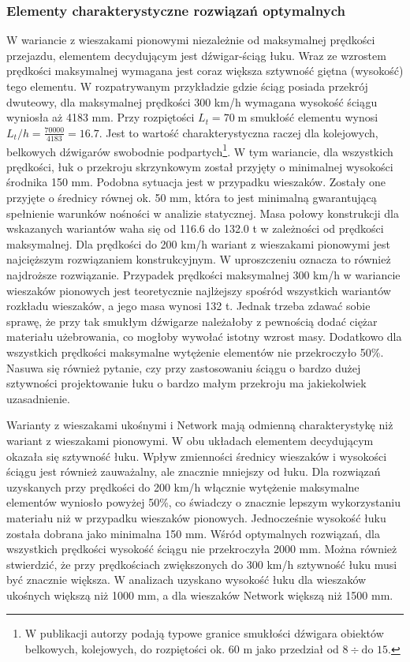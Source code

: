 \subsubsection{Elementy charakterystyczne rozwiązań optymalnych}
W wariancie z wieszakami pionowymi niezależnie od maksymalnej prędkości przejazdu, elementem decydującym jest dźwigar-ściąg łuku. Wraz ze wzrostem prędkości maksymalnej wymagana jest coraz większa sztywność giętna (wysokość) tego elementu. W rozpatrywanym przykładzie gdzie ściąg posiada przekrój dwuteowy, dla maksymalnej prędkości 300 km/h wymagana wysokość ściągu wyniosła aż 4183 mm. Przy rozpiętości $L_t=70\;\mathrm{m}$ smukłość elementu wynosi $L_t/h=\frac{70 000}{4183}=16.7$. Jest to wartość charakterystyczna raczej dla kolejowych, belkowych dźwigarów swobodnie podpartych\footnote{
		W publikacji \cite{Madaj2009} autorzy podają typowe granice smukłości dźwigara obiektów belkowych, kolejowych, do rozpiętości ok. 60 m jako przedział od $8 \div \text{do } 15$.}. 
W tym wariancie, dla wszystkich prędkości, łuk o przekroju skrzynkowym został przyjęty o minimalnej wysokości środnika 150 mm. Podobna sytuacja jest w przypadku wieszaków. Zostały one przyjęte o średnicy równej ok. 50 mm, która to jest minimalną gwarantującą spełnienie warunków nośności w analizie statycznej. Masa połowy konstrukcji dla wskazanych wariantów waha się od 116.6 do 132.0 t w zależności od prędkości maksymalnej. Dla prędkości do 200 km/h wariant z wieszakami pionowymi jest najcięższym rozwiązaniem konstrukcyjnym. W uproszczeniu oznacza to również najdroższe rozwiązanie. Przypadek prędkości maksymalnej 300 km/h w wariancie wieszaków pionowych jest teoretycznie najlżejszy spośród wszystkich wariantów rozkładu wieszaków, a jego masa wynosi 132 t. Jednak trzeba zdawać sobie sprawę, że przy tak smukłym dźwigarze należałoby z pewnością dodać ciężar materiału użebrowania, co mogłoby wywołać istotny wzrost masy. Dodatkowo dla wszystkich prędkości maksymalne wytężenie elementów nie przekroczyło 50\%. Nasuwa się również pytanie, czy przy zastosowaniu ściągu o bardzo dużej sztywności projektowanie łuku o bardzo małym przekroju ma jakiekolwiek uzasadnienie. 


Warianty z wieszakami ukośnymi i Network mają odmienną charakterystykę niż wariant z wieszakami pionowymi. W obu układach elementem decydującym okazała się sztywność łuku. Wpływ zmienności średnicy wieszaków i wysokości ściągu jest również zauważalny, ale znacznie mniejszy od łuku. Dla rozwiązań uzyskanych przy prędkości do 200 km/h włącznie wytężenie maksymalne elementów wyniosło powyżej 50\%, co świadczy o znacznie lepszym wykorzystaniu materiału niż w przypadku wieszaków pionowych. Jednocześnie wysokość łuku została dobrana jako minimalna 150 mm. Wśród optymalnych rozwiązań, dla wszystkich prędkości wysokość ściągu nie przekroczyła 2000 mm. Można również stwierdzić, że przy prędkościach zwiększonych do 300 km/h sztywność łuku musi być znacznie większa. W analizach uzyskano wysokość łuku dla wieszaków ukośnych większą niż 1000 mm, a dla wieszaków Network większą niż 1500 mm.

